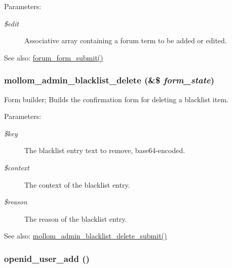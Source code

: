 \begin{Desc}
\item[Parameters:]
\begin{description}
\item[{\em \$edit}]Associative array containing a forum term to be added or edited.\end{description}
\end{Desc}
\begin{Desc}
\item[See also:]\hyperlink{forum_8admin_8inc_517cd1e23374b0242a197a3c5250a0c9}{forum\_\-form\_\-submit()} \end{Desc}
\hypertarget{group__forms_g8aa3d33609ffa56c5eba65649c82eec8}{
\subsubsection[{mollom\_\-admin\_\-blacklist\_\-delete}]{\setlength{\rightskip}{0pt plus 5cm}mollom\_\-admin\_\-blacklist\_\-delete (\&\$ {\em form\_\-state})}}
\label{group__forms_g8aa3d33609ffa56c5eba65649c82eec8}


Form builder; Builds the confirmation form for deleting a blacklist item.

\begin{Desc}
\item[Parameters:]
\begin{description}
\item[{\em \$key}]The blacklist entry text to remove, base64-encoded. \item[{\em \$context}]The context of the blacklist entry. \item[{\em \$reason}]The reason of the blacklist entry.\end{description}
\end{Desc}
\begin{Desc}
\item[See also:]\hyperlink{mollom_8admin_8inc_95f138b10a8be8da177bf7bbfe8d7a39}{mollom\_\-admin\_\-blacklist\_\-delete\_\-submit()} \end{Desc}
\hypertarget{group__forms_g53081778c1fc8e8ff8ab89f9000774b7}{
\subsubsection[{openid\_\-user\_\-add}]{\setlength{\rightskip}{0pt plus 5cm}openid\_\-user\_\-add ()}}
\label{group__forms_g53081778c1fc8e8ff8ab89f9000774b7}


